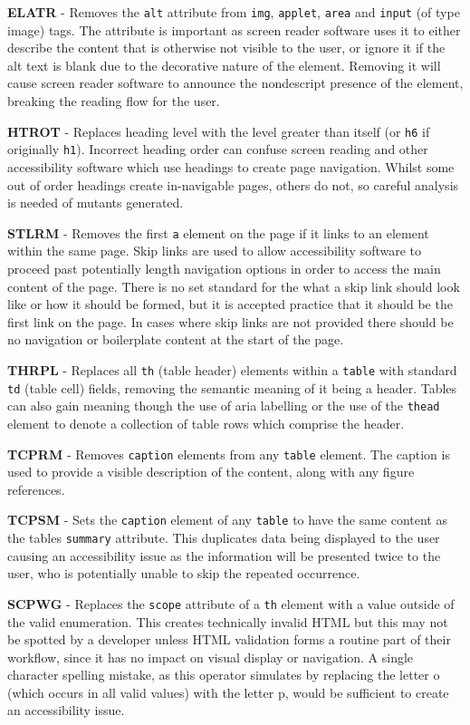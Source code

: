 \textbf{ELATR} - Removes the \texttt{alt} attribute from \texttt{img}, \texttt{applet}, \texttt{area} and \texttt{input} (of type image) tags. The attribute is important as screen reader software uses it to either describe the content that is otherwise not visible to the user, or ignore it if the alt text is blank due to the decorative nature of the element. Removing it will cause screen reader software to announce the nondescript presence of the element, breaking the reading flow for the user.

\textbf{HTROT} - Replaces heading level with the level greater than itself (or \texttt{h6} if originally \texttt{h1}). Incorrect heading order can confuse screen reading and other accessibility software which use headings to create page navigation. Whilst some out of order headings create in-navigable pages, others do not, so careful analysis is needed of mutants generated.

\textbf{STLRM} - Removes the first \texttt{a} element on the page if it links to an element within the same page. Skip links are used to allow accessibility software to proceed past potentially length navigation options in order to access the main content of the page. There is no set standard for the what a skip link should look like or how it should be formed, but it is accepted practice that it should be the first link on the page. In cases where skip links are not provided there should be no navigation or boilerplate content at the start of the page.

\textbf{THRPL} - Replaces all \texttt{th} (table header) elements within a \texttt{table} with standard \texttt{td} (table cell) fields, removing the semantic meaning of it being a header. Tables can also gain meaning though the use of aria labelling or the use of the \texttt{thead} element to denote a collection of table rows which comprise the header.

\textbf{TCPRM} - Removes \texttt{caption} elements from any \texttt{table} element. The caption is used to provide a visible description of the content, along with any figure references.

\textbf{TCPSM} - Sets the \texttt{caption} element of any \texttt{table} to have the same content as the tables \texttt{summary} attribute. This duplicates data being displayed to the user causing an accessibility issue as the information will be presented twice to the user, who is potentially unable to skip the repeated occurrence.

\textbf{SCPWG} - Replaces the \texttt{scope} attribute of a \texttt{th} element with a value outside of the valid enumeration. This creates technically invalid HTML but this may not be spotted by a developer unless HTML validation forms a routine part of their workflow, since it has no impact on visual display or navigation. A single character spelling mistake, as this operator simulates by replacing the letter o (which occurs in all valid values) with the letter p, would be sufficient to create an accessibility issue.

